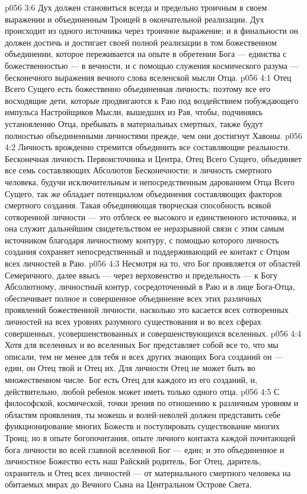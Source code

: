 \vs p056 3:6 Дух должен становиться всегда и предельно троичным в своем выражении и объединенным Троицей в окончательной реализации. Дух происходит из одного источника через троичное выражение; и в финальности он должен достичь и достигает своей полной реализации в том божественном объединении, которое переживается на опыте в обретении Бога --- единства с божественностью --- в вечности, и с помощью служения космического разума --- бесконечного выражения вечного слова вселенской мысли Отца.
\vs p056 4:1 Отец Всего Сущего есть божественно объединенная личность; поэтому все его восходящие дети, которые продвигаются к Раю под воздействием побуждающего импульса Настройщиков Мысли, вышедших из Рая, чтобы, подчиняясь установлению Отца, пребывать в материальных смертных, также будут полностью объединенными личностями прежде, чем они достигнут Хавоны.
\vs p056 4:2 Личность врожденно стремится объединить все составляющие реальности. Бесконечная личность Первоисточника и Центра, Отец Всего Сущего, объединяет все семь составляющих Абсолютов Бесконечности; и личность смертного человека, будучи исключительным и непосредственным дарованием Отца Всего Сущего, так же обладает потенциалом объединения составляющих факторов смертного создания. Такая объединяющая творческая способность всякой сотворенной личности --- это отблеск ее высокого и единственного источника, и она служит дальнейшим свидетельством ее неразрывной связи с этим самым источником благодаря личностному контуру, с помощью которого личность создания сохраняет непосредственный и поддерживающий ее контакт с Отцом всех личностей в Раю.
\vs p056 4:3 Несмотря на то, что Бог проявляется от областей Семеричного, далее ввысь --- через верховенство и предельность --- к Богу Абсолютному, личностный контур, сосредоточенный в Раю и в лице Бога\hyp{}Отца, обеспечивает полное и совершенное объединение всех этих различных проявлений божественной личности, насколько это касается всех сотворенных личностей на всех уровнях разумного существования и во всех сферах совершенных, усовершенствованных и совершенствующихся вселенных.
\vs p056 4:4 \pc Хотя для вселенных и во вселенных Бог представляет собой все то, что мы описали, тем не менее для тебя и всех других знающих Бога созданий он --- един, он Отец твой и Отец их. Для личности Отец не может быть во множественном числе. Бог есть Отец для каждого из его созданий, и, действительно, любой ребенок может иметь только одного отца.
\vs p056 4:5 С философской, космической, точки зрения по отношению к различным уровням и областям проявления, ты можешь и волей\hyp{}неволей должен представить себе функционирование многих Божеств и постулировать существование многих Троиц; но в опыте богопочитания, опыте личного контакта каждой почитающей бога личности во всей главной вселенной Бог --- един; и это объединенное и личностное Божество есть наш Райский родитель, Бог Отец, даритель, охранитель и Отец всех личностей --- от материального смертного человека на обитаемых мирах до Вечного Сына на Центральном Острове Света.
